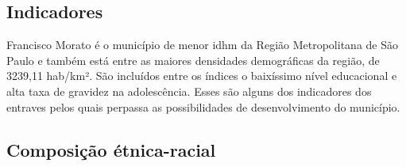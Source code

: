 	\subsection{Indicadores}
	
	Francisco Morato é o município de menor \gls{idhm} da Região Metropolitana de São Paulo e também está entre as maiores densidades demográficas da região, de 3239,11 hab/km². São incluídos entre os índices o baixíssimo nível educacional e alta taxa de gravidez na adolescência. Esses são alguns dos indicadores dos entraves pelos quais perpassa as possibilidades de desenvolvimento do município.
	
	\subsection{Composição étnica-racial}

